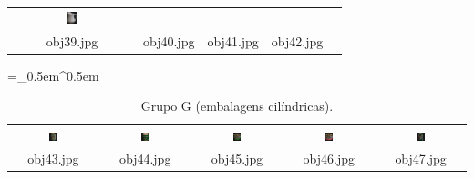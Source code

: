 \begin{table}[H]
\begin{tabu}{|ccccc|}
    \includegraphics[width=0.1\textwidth,height=0.1\textwidth]{imagens/coil_100/chicaras/obj97__0.png} &
    \\
    \scriptsize{obj39.jpg} & \scriptsize{obj40.jpg} & \scriptsize{obj41.jpg} &
    \scriptsize{obj42.jpg} &
  \end{tabu}
\end{table}

\begin{table}[H]
  \centering
  \caption{Grupo G (embalagens cilíndricas).}
  \tabulinesep =_0.5em^0.5em
  \everyrow{\tabucline[0.4pt]-}
  \begin{tabu}{|ccccc|}
    \includegraphics[width=0.1\textwidth,height=0.1\textwidth]{imagens/coil_100/embalagens_cilindricas/obj7__0.png} &
    \includegraphics[width=0.1\textwidth,height=0.1\textwidth]{imagens/coil_100/embalagens_cilindricas/obj26__0.png} &
    \includegraphics[width=0.1\textwidth,height=0.1\textwidth]{imagens/coil_100/embalagens_cilindricas/obj29__0.png} &
    \includegraphics[width=0.1\textwidth,height=0.1\textwidth]{imagens/coil_100/embalagens_cilindricas/obj32__0.png} &
    \includegraphics[width=0.1\textwidth,height=0.1\textwidth]{imagens/coil_100/embalagens_cilindricas/obj49__0.png}
    \\
    \scriptsize{obj43.jpg} & \scriptsize{obj44.jpg} & \scriptsize{obj45.jpg} &
    \scriptsize{obj46.jpg} & \scriptsize{obj47.jpg}
    \\

\end{tabu}
\end{table}
